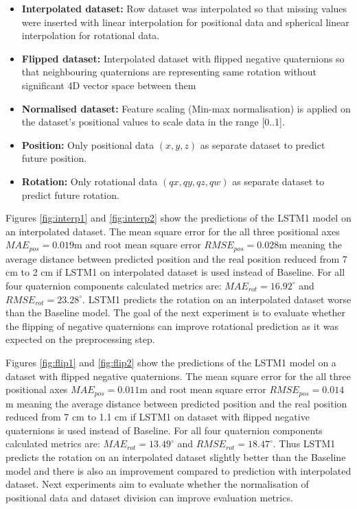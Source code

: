\begin{itemize}
	\item \textbf{Interpolated dataset:} Row dataset was interpolated so that missing values were inserted with linear interpolation for positional data and spherical linear interpolation for rotational data. 
	\item \textbf{Flipped dataset:} Interpolated dataset with flipped negative quaternions so that neighbouring quaternions are representing same rotation without significant 4D vector space between them
	\item \textbf{Normalised dataset:} Feature scaling (Min-max normalisation) is applied on the dataset's positional values to scale data in the range [0..1]. 
	\item \textbf{Position:} Only positional data $(x, y, z)$ as separate dataset to predict future position. 
	\item \textbf{Rotation:} Only rotational data $(qx, qy, qz, qw)$ as separate dataset to predict future rotation. 
	
\end{itemize}



Figures \ref{fig:interp1} and \ref{fig:interp2} show the predictions of the LSTM1 model on an interpolated dataset. The mean square error for the all three positional axes $MAE_{pos} = 0.019$m and root mean square error  $RMSE_{pos} = 0.028$m meaning the average distance between predicted position and the real position reduced from 7 cm to 2 cm if LSTM1 on interpolated dataset is used instead of Baseline. For all four quaternion components calculated metrics  are: $MAE_{rot} = 16.92^{\circ}$ and $RMSE_{rot}  =23.28^{\circ}$. LSTM1 predicts the rotation on an interpolated dataset worse than the Baseline model. The goal of the next experiment is to evaluate whether the flipping of negative quaternions can improve rotational prediction as it was expected on the preprocessing step.

Figures \ref{fig:flip1} and \ref{fig:flip2} show the predictions of the LSTM1 model on a dataset with flipped negative quaternions. The mean square error for the all three positional axes $MAE_{pos} = 0.011$m and root mean square error  $RMSE_{pos} = 0.014$m meaning the average distance between predicted position and the real position reduced from 7 cm to 1.1 cm if LSTM1 on dataset with flipped negative quaternions is used instead of Baseline. For all four quaternion components calculated metrics are: $MAE_{rot} = 13.49^{\circ}$ and $RMSE_{rot}  =18.47^{\circ}$. Thus LSTM1 predicts the rotation on an interpolated dataset slightly better than the Baseline model and there is also an improvement compared to prediction with interpolated dataset. Next experiments aim to evaluate whether the normalisation of positional data and dataset division can improve evaluation metrics. 

